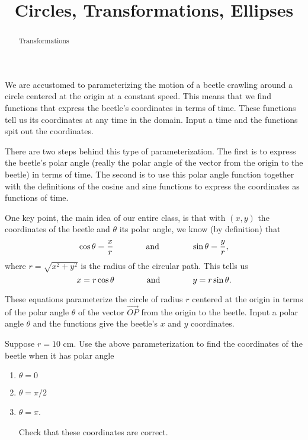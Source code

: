 \documentclass{ximera}
\title{Circles, Transformations, Ellipses}
\begin{document}
\begin{abstract}
Transformations
\end{abstract}
\maketitle



We are accustomed to parameterizing the motion of a beetle crawling around a circle centered at the origin at a constant speed. This means that we find functions that express the beetle's coordinates in terms of time. These functions tell us its coordinates at any time in the domain. Input a time and the functions spit out the coordinates.

There are two steps behind this type of parameterization. The first is to express the beetle's polar angle (really the polar angle of the vector from the origin to the beetle) in terms of time. The second is to use this polar angle function together with the definitions of the cosine and sine functions to express the coordinates as functions of time.

One key point, the main idea of our entire class, is that with $(x,y)$ the coordinates of the beetle and $\theta$ its polar angle, we know (by definition) that
\[
   \cos\theta = \frac{x}{r} \hskip 0.5 in \text{ and } \hskip 0.5 in \sin\theta = \frac{y}{r},
\] 
where $r = \sqrt{x^2+y^2}$ is the radius of the circular path. This tells us
\[
   x = r \cos \theta \hskip 0.5 in \text{ and } \hskip 0.5 in  y = r\sin \theta.
\]

These equations parameterize the circle of radius $r$ centered at the origin in terms of the polar angle $\theta$ of the vector $\overrightarrow{OP}$ from the origin to the beetle. Input a polar angle $\theta$ and the functions give the beetle's $x$ and $y$ coordinates.

\begin{question} \label{Q9edDEFRLERr3}
Suppose $r=10$ cm. Use the above parameterization to find the coordinates of the beetle when it has polar angle
\begin{enumerate}
\item $\theta = 0$

\item $\theta = \pi/2$

\item $\theta = \pi$.

Check that these coordinates are correct.
\end{enumerate}
\end{question}
\end{document}
